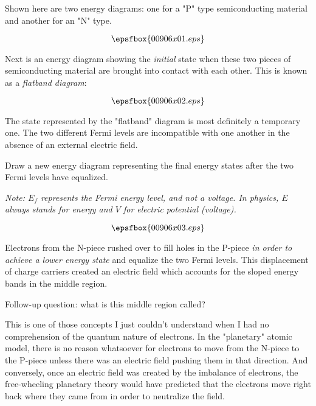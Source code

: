 

Shown here are two energy diagrams: one for a "P" type semiconducting material and another for an "N" type.

$$\epsfbox{00906x01.eps}$$

Next is an energy diagram showing the {\it initial} state when these two pieces of semiconducting material are brought into contact with each other.  This is known as a {\it flatband diagram}:

$$\epsfbox{00906x02.eps}$$

The state represented by the "flatband" diagram is most definitely a temporary one.  The two different Fermi levels are incompatible with one another in the absence of an external electric field.

Draw a new energy diagram representing the final energy states after the two Fermi levels have equalized.

\vskip 10pt

{\it Note: $E_f$ represents the Fermi energy level, and not a voltage.  In physics, $E$ always stands for energy and $V$ for electric potential (voltage).} 







$$\epsfbox{00906x03.eps}$$

Electrons from the N-piece rushed over to fill holes in the P-piece {\it in order to achieve a lower energy state} and equalize the two Fermi levels.  This displacement of charge carriers created an electric field which accounts for the sloped energy bands in the middle region.

\vskip 10pt

Follow-up question: what is this middle region called?







This is one of those concepts I just couldn't understand when I had no comprehension of the quantum nature of electrons.  In the "planetary" atomic model, there is no reason whatsoever for electrons to move from the N-piece to the P-piece unless there was an electric field pushing them in that direction.  And conversely, once an electric field was created by the imbalance of electrons, the free-wheeling planetary theory would have predicted that the electrons move right back where they came from in order to neutralize the field.

